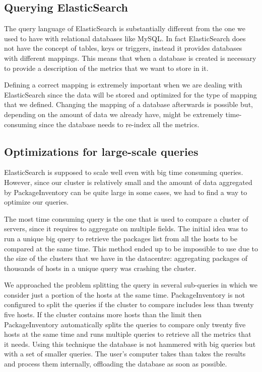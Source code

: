 \subsection{Querying ElasticSearch}

The query language of ElasticSearch is substantially different from the
one we used to have with relational databases like MySQL\@. In fact
ElasticSearch does not have the concept of tables, keys or triggers,
instead it provides databases with different mappings. This means that
when a database is created is necessary to provide a description of the
metrics that we want to store in it.

Defining a correct mapping is extremely important when we are dealing with
ElasticSearch since the data will be stored and optimized for the type of
mapping that we defined. Changing the mapping of a database afterwards is
possible but, depending on the amount of data we already have, might be
extremely time-consuming since the database needs to re-index all the
metrics.

\subsection{Optimizations for large-scale queries}

ElasticSearch is supposed to scale well even with big time consuming
queries. However, since our cluster is relatively small and the amount of
data aggregated by PackageInventory can be quite large in some cases, we
had to find a way to optimize our queries.

The most time consuming query is the one that is used to compare a cluster
of servers, since it requires to aggregate on multiple fields. The initial
idea was to run a unique big query to retrieve the packages list from all
the hosts to be compared at the same time. This method ended up to be
impossible to use due to the size of the clusters that we have in the
datacentre: aggregating packages of thousands of hosts in a unique query
was crashing the cluster.

We approached the problem splitting the query in several sub-queries in
which we consider just a portion of the hosts at the same time.
PackageInventory is not configured to split the queries if the cluster to
compare includes less than twenty five hosts. If the cluster contains more
hosts than the limit then PackageInventory automatically splits the
queries to compare only twenty five hosts at the same time and runs
multiple queries to retrieve all the metrics that it needs. Using this
technique the database is not hammered with big queries but with a set of
smaller queries. The user's computer takes than takes the results and
process them internally, offloading the database as soon as possible.
